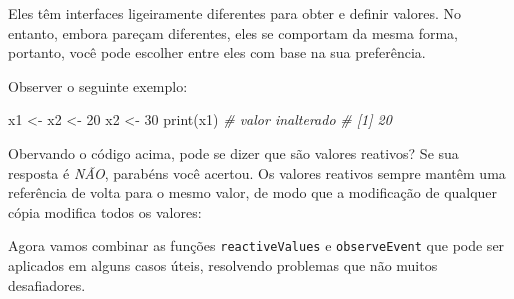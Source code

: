 \documentclass[
]{book}
\newenvironment{Shaded}{\begin{snugshade}}{\end{snugshade}}
\newcommand{\AttributeTok}[1]{\textcolor[rgb]{0.77,0.63,0.00}{#1}}
\newcommand{\CommentTok}[1]{\textcolor[rgb]{0.56,0.35,0.01}{\textit{#1}}}
\newcommand{\DecValTok}[1]{\textcolor[rgb]{0.00,0.00,0.81}{#1}}
\newcommand{\FunctionTok}[1]{\textcolor[rgb]{0.00,0.00,0.00}{#1}}
\newcommand{\NormalTok}[1]{#1}
\newcommand{\OtherTok}[1]{\textcolor[rgb]{0.56,0.35,0.01}{#1}}
\newcommand{\SpecialCharTok}[1]{\textcolor[rgb]{0.00,0.00,0.00}{#1}}
\begin{document}
Eles têm interfaces ligeiramente diferentes para obter e definir valores. No entanto, embora pareçam diferentes, eles se comportam da mesma forma, portanto, você pode escolher entre eles com base na sua preferência.

Observer o seguinte exemplo:

\begin{Shaded}
\begin{Highlighting}[]
\NormalTok{x1 }\OtherTok{\textless{}{-}}\NormalTok{ x2 }\OtherTok{\textless{}{-}} \DecValTok{20}
\NormalTok{x2 }\OtherTok{\textless{}{-}} \DecValTok{30}
\FunctionTok{print}\NormalTok{(x1) }\CommentTok{\# valor inalterado}
\CommentTok{\#  [1] 20}
\end{Highlighting}
\end{Shaded}

Obervando o código acima, pode se dizer que são valores reativos?
Se sua resposta é \emph{NÃO}, parabéns você acertou. Os valores reativos sempre mantêm uma referência de volta para o mesmo valor, de modo que a modificação de qualquer cópia modifica todos os valores:

\begin{Shaded}
\end{Shaded}

Agora vamos combinar as funções \texttt{reactiveValues} e \texttt{observeEvent} que pode ser aplicados em alguns casos úteis, resolvendo problemas que não muitos desafiadores.
\end{document}
